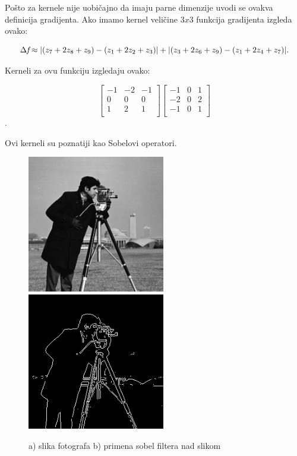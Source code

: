\documentclass[a4paper,12pt,titlepage]{article}
\begin{document}
Pošto za kernele nije uobičajno da imaju parne dimenzije uvodi se ovakva definicija gradijenta. Ako imamo kernel veličine $3 x 3$ funkcija gradijenta izgleda ovako: 

\begin{equation}\label{eq:grad14}
\Delta \emph{f} \approx |(z_7 + 2z_8 + z_9) - (z_1 + 2z_2 + z_3)| + |(z_3 + 2z_6 + z_9) - (z_1 + 2z_4 + z_7)|.
\end{equation}

Kerneli za ovu funkciju izgledaju ovako: 

 \[
\begin{bmatrix}
     -1 & -2 & -1 \\
     0 & 0 & 0 \\
     1 & 2 & 1 \\
\end{bmatrix}
\begin{bmatrix}
     -1 & 0 & 1 \\
     -2 & 0 & 2 \\
     -1 & 0 & 1 \\
\end{bmatrix}
\].

Ovi kerneli su poznatiji kao Sobelovi operatori. 

\begin{figure}[ht!]
\centering
\includegraphics[width=60mm]{img/img.png}
\includegraphics[width=60mm]{img/imgSob.png}
\caption{a) slika fotografa b) primena sobel filtera nad slikom}
\label{overflow}
\end{figure}
\end{document}
